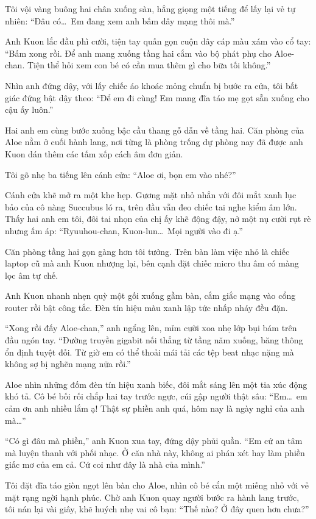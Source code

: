 \documentclass[../main.tex]{subfiles}
\begin{document}
Tôi vội vàng buông hai chân xuống sàn, hắng giọng một tiếng để lấy lại vẻ tự nhiên: ``Đâu có\dots\ Em đang xem anh bấm dây mạng thôi mà.''

Anh Kuon lắc đầu phì cười, tiện tay quấn gọn cuộn dây cáp màu xám vào cổ tay: ``Bấm xong rồi. Để anh mang xuống tầng hai cắm vào bộ phát phụ cho Aloe-chan. Tiện thể hỏi xem con bé có cần mua thêm gì cho bữa tối không.''

Nhìn anh đứng dậy, với lấy chiếc áo khoác mỏng chuẩn bị bước ra cửa, tôi bất giác đứng bật dậy theo: ``Để em đi cùng! Em mang đĩa táo mẹ gọt sẵn xuống cho cậu ấy luôn.''

Hai anh em cùng bước xuống bậc cầu thang gỗ dẫn về tầng hai. Căn phòng của Aloe nằm ở cuối hành lang, nơi từng là phòng trống dự phòng nay đã được anh Kuon dán thêm các tấm xốp cách âm đơn giản.

Tôi gõ nhẹ ba tiếng lên cánh cửa: ``Aloe ơi, bọn em vào nhé?''

Cánh cửa khẽ mở ra một khe hẹp. Gương mặt nhỏ nhắn với đôi mắt xanh lục bảo của cô nàng Succubus ló ra, trên đầu vẫn đeo chiếc tai nghe kiểm âm lớn. Thấy hai anh em tôi, đôi tai nhọn của chị ấy khẽ động đậy, nở một nụ cười rụt rè nhưng ấm áp: ``Ryuuhou-chan, Kuon-lun\dots\ Mọi người vào đi ạ.''

Căn phòng tầng hai gọn gàng hơn tôi tưởng. Trên bàn làm việc nhỏ là chiếc laptop cũ mà anh Kuon nhượng lại, bên cạnh đặt chiếc micro thu âm có màng lọc âm tự chế.

Anh Kuon nhanh nhẹn quỳ một gối xuống gầm bàn, cắm giắc mạng vào cổng router rồi bật công tắc. Đèn tín hiệu màu xanh lập tức nhấp nháy đều đặn.

``Xong rồi đấy Aloe-chan,'' anh ngẩng lên, mỉm cười xoa nhẹ lớp bụi bám trên đầu ngón tay. ``Đường truyền gigabit nối thẳng từ tầng năm xuống, băng thông ổn định tuyệt đối. Từ giờ em có thể thoải mái tải các tệp beat nhạc nặng mà không sợ bị nghẽn mạng nữa rồi.''

Aloe nhìn những đốm đèn tín hiệu xanh biếc, đôi mắt sáng lên một tia xúc động khó tả. Cô bé bối rối chắp hai tay trước ngực, cúi gập người thật sâu: ``Em\dots\ em cảm ơn anh nhiều lắm ạ! Thật sự phiền anh quá, hôm nay là ngày nghỉ của anh mà\dots''

``Có gì đâu mà phiền,'' anh Kuon xua tay, đứng dậy phủi quần. ``Em cứ an tâm mà luyện thanh với phối nhạc. Ở căn nhà này, không ai phán xét hay làm phiền giấc mơ của em cả. Cứ coi như đây là nhà của mình.''

Tôi đặt đĩa táo giòn ngọt lên bàn cho Aloe, nhìn cô bé cắn một miếng nhỏ với vẻ mặt rạng ngời hạnh phúc. Chờ anh Kuon quay người bước ra hành lang trước, tôi nán lại vài giây, khẽ huých nhẹ vai cô bạn: ``Thế nào? Ở đây quen hơn chưa?''
\end{document}
